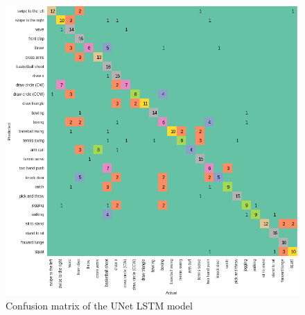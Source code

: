 \documentclass[conference]{IEEEtran}
\begin{document}
\begin{figure}[H]
\begin{center}
\includegraphics[scale=0.3]{UNet_LSTM/UNet_lstm_confusion_matrix.png}
\end{center}
\caption{\label{fig:confusion_matrix_UNet_LSTM} 
Confusion matrix of the UNet LSTM model}
\end{figure}
\end{document}

